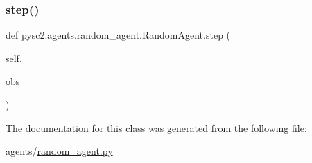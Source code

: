 \subsubsection{\texorpdfstring{step()}{step()}}
{\footnotesize\ttfamily def pysc2.\+agents.\+random\+\_\+agent.\+Random\+Agent.\+step (\begin{DoxyParamCaption}\item[{}]{self,  }\item[{}]{obs }\end{DoxyParamCaption})}



The documentation for this class was generated from the following file\+:\begin{DoxyCompactItemize}
\item 
agents/\mbox{\hyperlink{random__agent_8py}{random\+\_\+agent.\+py}}\end{DoxyCompactItemize}

